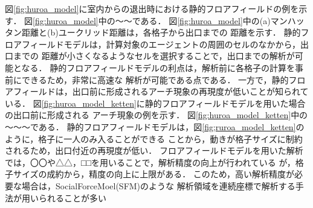 図\ref{fig:huroa_model}に室内からの退出時における静的フロアフィールドの例を示す．
図\ref{fig:huroa_model}中の～～である．
図\ref{fig:huroa_model}中の(a)マンハッタン距離と(b)ユークリッド距離は，各格子から出口までの
距離を示す．
静的フロアフィールドモデルは，計算対象のエージェントの周囲のセルのなかから，出口までの
距離が小さくなるようなセルを選択することで，出口までの解析が可能となる．
静的フロアフィールドモデルの利点は，解析前に各格子の計算を事前にできるため，非常に高速な
解析が可能である点である．
一方で，静的フロアフィールドは，出口前に形成されるアーチ現象の再現度が低いことが知られている．
図\ref{fig:huroa_model_ketten}に静的フロアフィールドモデルを用いた場合の出口前に形成される
アーチ現象の例を示す．
図\ref{fig:huroa_model_ketten}中の～～～である．
静的フロアフィールドモデルは，図\ref{fig;ruroa_model_ketten}のように，格子に一人のみ入ることができる
ことから，動きが格子サイズに制約されるため，出口付近の再現度が低い．
フロアフィールドモデルを用いた解析では，〇〇や△△，□□を用いることで，解析精度の向上が行われている
が，格子サイズの成約から，精度の向上に上限がある．
このため，高い解析精度が必要な場合は，SocialForceMoel(SFM)のような
解析領域を連続座標で解析する手法が用いられることが多い




